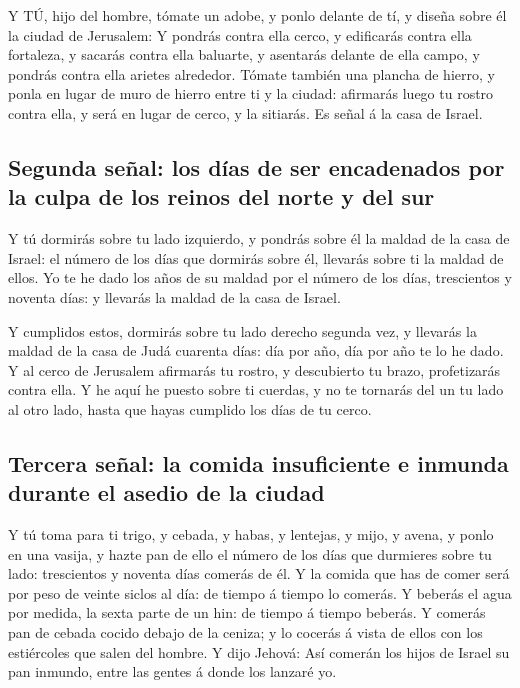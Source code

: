 Y TÚ, hijo del hombre, tómate un adobe, y ponlo delante de
tí, y diseña sobre él la ciudad de Jerusalem:  Y pondrás
contra ella cerco, y edificarás contra ella fortaleza, y sacarás contra
ella baluarte, y asentarás delante de ella campo, y pondrás contra ella
arietes alrededor.  Tómate también una plancha de hierro, y
ponla en lugar de muro de hierro entre ti y la ciudad: afirmarás luego
tu rostro contra ella, y será en lugar de cerco, y la sitiarás. Es señal
á la casa de Israel.

\hypertarget{segunda-seuxf1al-los-duxedas-de-ser-encadenados-por-la-culpa-de-los-reinos-del-norte-y-del-sur}{%
\subsection{Segunda señal: los días de ser encadenados por la culpa de
los reinos del norte y del
sur}\label{segunda-seuxf1al-los-duxedas-de-ser-encadenados-por-la-culpa-de-los-reinos-del-norte-y-del-sur}}

 Y tú dormirás sobre tu lado izquierdo, y pondrás sobre él
la maldad de la casa de Israel: el número de los días que dormirás sobre
él, llevarás sobre ti la maldad de ellos.  Yo te he dado los
años de su maldad por el número de los días, trescientos y noventa días:
y llevarás la maldad de la casa de Israel.

 Y cumplidos estos, dormirás sobre tu lado derecho segunda
vez, y llevarás la maldad de la casa de Judá cuarenta días: día por año,
día por año te lo he dado.  Y al cerco de Jerusalem
afirmarás tu rostro, y descubierto tu brazo, profetizarás contra ella.
 Y he aquí he puesto sobre ti cuerdas, y no te tornarás del
un tu lado al otro lado, hasta que hayas cumplido los días de tu cerco.

\hypertarget{tercera-seuxf1al-la-comida-insuficiente-e-inmunda-durante-el-asedio-de-la-ciudad}{%
\subsection{Tercera señal: la comida insuficiente e inmunda durante el
asedio de la
ciudad}\label{tercera-seuxf1al-la-comida-insuficiente-e-inmunda-durante-el-asedio-de-la-ciudad}}

 Y tú toma para ti trigo, y cebada, y habas, y lentejas, y
mijo, y avena, y ponlo en una vasija, y hazte pan de ello el número de
los días que durmieres sobre tu lado: trescientos y noventa días comerás
de él.  Y la comida que has de comer será por peso de
veinte siclos al día: de tiempo á tiempo lo comerás.  Y
beberás el agua por medida, la sexta parte de un hin: de tiempo á tiempo
beberás.  Y comerás pan de cebada cocido debajo de la
ceniza; y lo cocerás á vista de ellos con los estiércoles que salen del
hombre.  Y dijo Jehová: Así comerán los hijos de Israel su
pan inmundo, entre las gentes á donde los lanzaré yo.

